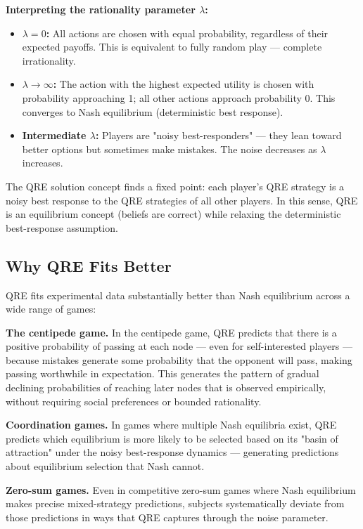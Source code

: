 \documentclass[12pt, letterpaper]{article}
\begin{document}
\textbf{Interpreting the rationality parameter $\lambda$:}
\begin{itemize}
\item \textbf{$\lambda = 0$:} All actions are chosen with equal probability, regardless of their expected payoffs. This is equivalent to fully random play --- complete irrationality.
\item \textbf{$\lambda \to \infty$:} The action with the highest expected utility is chosen with probability approaching 1; all other actions approach probability 0. This converges to Nash equilibrium (deterministic best response).
\item \textbf{Intermediate $\lambda$:} Players are "noisy best-responders" --- they lean toward better options but sometimes make mistakes. The noise decreases as $\lambda$ increases.
\end{itemize}

The QRE solution concept finds a fixed point: each player's QRE strategy is a noisy best response to the QRE strategies of all other players. In this sense, QRE is an equilibrium concept (beliefs are correct) while relaxing the deterministic best-response assumption.


\subsection{Why QRE Fits Better}


QRE fits experimental data substantially better than Nash equilibrium across a wide range of games:

\textbf{The centipede game.} In the centipede game, QRE predicts that there is a positive probability of passing at each node --- even for self-interested players --- because mistakes generate some probability that the opponent will pass, making passing worthwhile in expectation. This generates the pattern of gradual declining probabilities of reaching later nodes that is observed empirically, without requiring social preferences or bounded rationality.

\textbf{Coordination games.} In games where multiple Nash equilibria exist, QRE predicts which equilibrium is more likely to be selected based on its "basin of attraction" under the noisy best-response dynamics --- generating predictions about equilibrium selection that Nash cannot.

\textbf{Zero-sum games.} Even in competitive zero-sum games where Nash equilibrium makes precise mixed-strategy predictions, subjects systematically deviate from those predictions in ways that QRE captures through the noise parameter.
\end{document}
